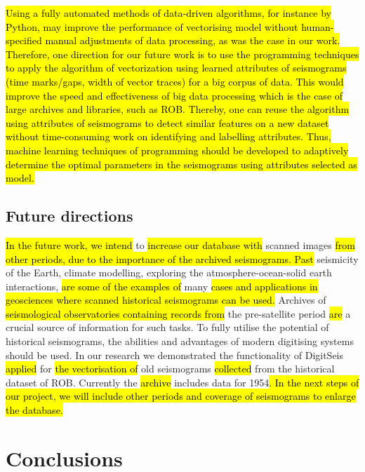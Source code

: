 \documentclass[sensors,article,submit,moreauthors,pdftex]{Definitions/mdpi}
\begin{document}
\hl{Using a fully automated methods of data-driven algorithms, for instance by Python, may improve the performance of vectorising model without human-specified manual adjustments of data processing, as was the case in our work. Therefore, one direction for our future work is to use the programming techniques to apply the algorithm of vectorization using learned attributes of seismograms (time marks/gaps, width of vector traces) for a big corpus of data. This would improve the speed and effectiveness of big data processing which is the case of large archives and libraries, such as ROB. Thereby, one can reuse the algorithm using attributes of seismograms to detect similar features on a new dataset without time-consuming work on identifying and labelling attributes. Thus, machine learning techniques of programming should be developed to adaptively determine the optimal parameters in the seismograms using attributes selected as model.}

\subsection{Future directions}
\hl{In the future work, we intend }to \hl{increase our database with} scanned images\hl{ from other periods, due to the importance of the archived seismograms. Past }seismicity of the Earth, climate modelling, exploring the atmosphere-ocean-solid earth interactions, \hl{are some of the examples of} many \hl{cases and applications in geosciences where scanned historical seismograms can be used. }Archives of \hl{seismological observatories containing records from }the pre-satellite period \hl{are }a crucial source of information for such tasks. To fully utilise the potential of historical seismograms, the abilities and advantages of modern digitising systems should be used. In our research we demonstrated the functionality of DigitSeis \hl{applied }for \hl{the vectorisation of }old seismograms \hl{collected }from the historical dataset of \ac{ROB}. Currently the \hl{archive }includes data for 1954\hl{. In the next steps of our project, we will include other periods and coverage of seismograms to enlarge the database.} 

\section{Conclusions}
\end{document}

